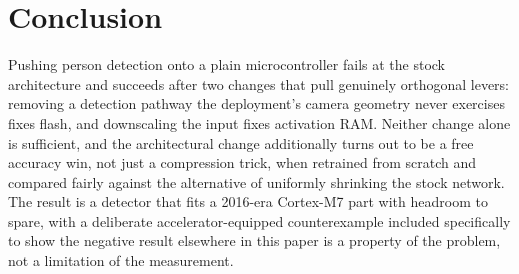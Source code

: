 \documentclass[11pt]{article}
\begin{document}
\section{Conclusion}

Pushing person detection onto a plain microcontroller fails at the stock
architecture and succeeds after two changes that pull genuinely orthogonal
levers: removing a detection pathway the deployment's camera geometry never
exercises fixes flash, and downscaling the input fixes activation RAM.
Neither change alone is sufficient, and the architectural change additionally
turns out to be a free accuracy win, not just a compression trick, when
retrained from scratch and compared fairly against the alternative of
uniformly shrinking the stock network. The result is a detector that fits a
2016-era Cortex-M7 part with headroom to spare, with a deliberate
accelerator-equipped counterexample included specifically to show the
negative result elsewhere in this paper is a property of the problem, not a
limitation of the measurement.



\end{document}

